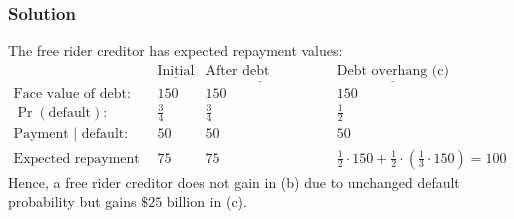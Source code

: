 \documentclass[12pt]{article}
\begin{document}
\begin{enumerate}
\begin{enumerate}
        \subsubsection*{Solution}

        The free rider creditor has expected repayment values:
        \begin{align*}
            & \underline{\text{Initial}} & \underline{\text{After debt forgiveness (b)}}
            && \underline{\text{Debt overhang (c)}}
            \\ \text{Face value of debt: }  & 150 & 150 && 150 
            \\ \Pr(\text{default}):\        & \frac{3}{4} & \frac{3}{4} && \frac{1}{2}
            \\ \text{Payment | default: }   & 50 & 50 && 50
            \\ \text{Expected repayment value: } & 75 &75 && \frac{1}{2}\cdot150+\frac{1}{2}\cdot\left(\frac{1}{3}\cdot150\right)= 100
        \end{align*}
        Hence, a free rider creditor does not gain in (b) due to unchanged default probability but gains $\$25$ billion in (c).

        
    \end{enumerate}

\end{enumerate}
\end{document}
